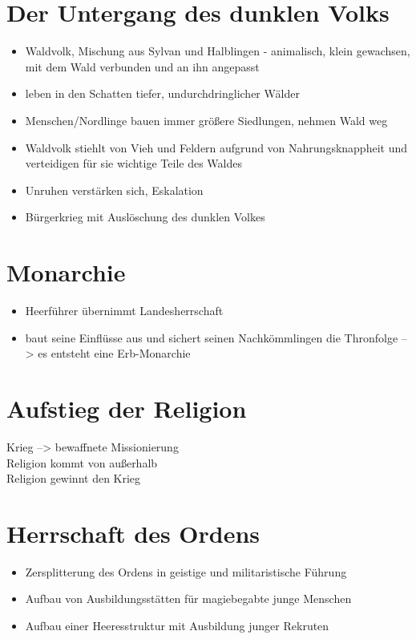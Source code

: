 \section{Der Untergang des dunklen Volks}
\begin{itemize}
	\item Waldvolk, Mischung aus Sylvan und Halblingen - animalisch, klein gewachsen, mit dem Wald verbunden und an ihn angepasst
	\item leben in den Schatten tiefer, undurchdringlicher Wälder
	\item Menschen/Nordlinge bauen immer größere Siedlungen, nehmen Wald weg
	\item Waldvolk stiehlt von Vieh und Feldern aufgrund von Nahrungsknappheit und verteidigen für sie wichtige Teile des Waldes
	\item Unruhen verstärken sich, Eskalation
	\item Bürgerkrieg mit Auslöschung des dunklen Volkes
\end{itemize}

\section{Monarchie}
\begin{itemize}
	\item Heerführer übernimmt Landesherrschaft
	\item baut seine Einflüsse aus und sichert seinen Nachkömmlingen die Thronfolge --> es entsteht eine Erb-Monarchie
\end{itemize}

\section{Aufstieg der Religion}
Krieg --> bewaffnete Missionierung\\
Religion kommt von außerhalb\\
Religion gewinnt den Krieg

\section{Herrschaft des Ordens}
\begin{itemize}
	\item Zersplitterung des Ordens in geistige und militaristische Führung
	\item Aufbau von Ausbildungsstätten für magiebegabte junge Menschen
	\item Aufbau einer Heeresstruktur mit Ausbildung junger Rekruten
	
\end{itemize}

